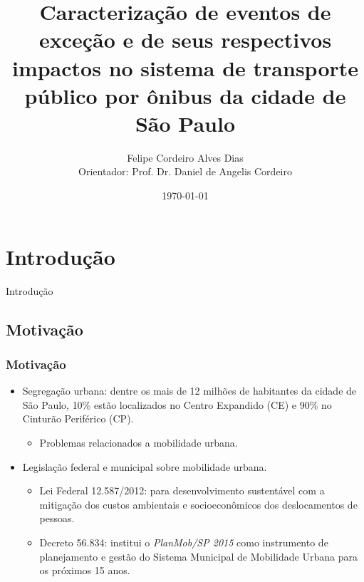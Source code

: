 \documentclass{beamer}
\title[Defesa de Mestrado]{Caracterização de eventos de exceção e de seus respectivos impactos no sistema de transporte público por ônibus da cidade de São Paulo} %
\author[DIAS, F.; CORDEIRO, D.]{Felipe Cordeiro Alves Dias\\[1mm]Orientador: Prof. Dr. Daniel de Angelis Cordeiro}
\institute[USP-EACH] %
{
Universidade de São Paulo \\ %
\medskip
}
\date{\today} %
\begin{document}
\begin{frame}
\titlepage %
\end{frame}

\section{Introdução}
\begin{frame}
\Huge{\centerline{Introdução}}
\end{frame}
\subsection{Motivação}
\begin{frame}
\frametitle{Motivação}
\begin{itemize}
\item Segregação urbana: dentre os mais de 12 milhões de habitantes da cidade de São Paulo, \alert{10\% estão localizados no Centro Expandido (CE)} e \alert{90\% no Cinturão Periférico (CP)}.
\begin{itemize}
\item Problemas relacionados a mobilidade urbana.
\end{itemize}
\end{itemize}

\begin{itemize}
\item Legislação federal e municipal sobre mobilidade urbana.
\begin{itemize}
\item Lei Federal 12.587/2012: \alert{para desenvolvimento sustentável com a mitigação dos custos ambientais e socioeconômicos dos deslocamentos de pessoas}.
\item Decreto 56.834: institui o \textit{PlanMob/SP 2015} \alert{como instrumento de planejamento e gestão do Sistema Municipal de Mobilidade Urbana para os próximos 15 anos}.
\end{itemize}
\end{itemize}

\end{frame}
\end{document}
